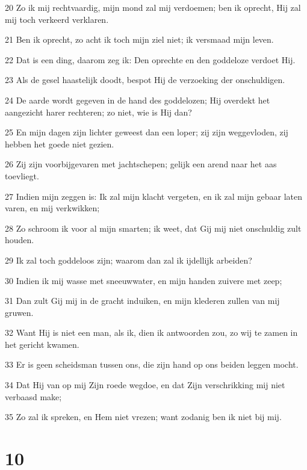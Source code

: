 \par 20 Zo ik mij rechtvaardig, mijn mond zal mij verdoemen; ben ik oprecht, Hij zal mij toch verkeerd verklaren.
\par 21 Ben ik oprecht, zo acht ik toch mijn ziel niet; ik versmaad mijn leven.
\par 22 Dat is een ding, daarom zeg ik: Den oprechte en den goddeloze verdoet Hij.
\par 23 Als de gesel haastelijk doodt, bespot Hij de verzoeking der onschuldigen.
\par 24 De aarde wordt gegeven in de hand des goddelozen; Hij overdekt het aangezicht harer rechteren; zo niet, wie is Hij dan?
\par 25 En mijn dagen zijn lichter geweest dan een loper; zij zijn weggevloden, zij hebben het goede niet gezien.
\par 26 Zij zijn voorbijgevaren met jachtschepen; gelijk een arend naar het aas toevliegt.
\par 27 Indien mijn zeggen is: Ik zal mijn klacht vergeten, en ik zal mijn gebaar laten varen, en mij verkwikken;
\par 28 Zo schroom ik voor al mijn smarten; ik weet, dat Gij mij niet onschuldig zult houden.
\par 29 Ik zal toch goddeloos zijn; waarom dan zal ik ijdellijk arbeiden?
\par 30 Indien ik mij wasse met sneeuwwater, en mijn handen zuivere met zeep;
\par 31 Dan zult Gij mij in de gracht induiken, en mijn klederen zullen van mij gruwen.
\par 32 Want Hij is niet een man, als ik, dien ik antwoorden zou, zo wij te zamen in het gericht kwamen.
\par 33 Er is geen scheidsman tussen ons, die zijn hand op ons beiden leggen mocht.
\par 34 Dat Hij van op mij Zijn roede wegdoe, en dat Zijn verschrikking mij niet verbaasd make;
\par 35 Zo zal ik spreken, en Hem niet vrezen; want zodanig ben ik niet bij mij.

\chapter{10}

